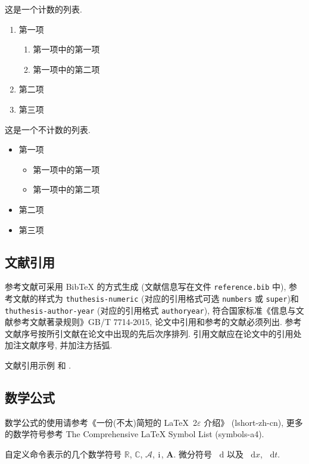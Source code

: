 \documentclass[zihao=-4]{ctexart}
\numberwithin{equation}{section}
\numberwithin{figure}{section}
\numberwithin{table}{section}
\theoremstyle{plain}
\newcommand{\dif}{\mathop{}\!\mathrm{d}}
\newcommand{\CC}{\ensuremath{\mathbb{C}}}
\newcommand{\RR}{\ensuremath{\mathbb{R}}}
\newcommand{\dx}[1][x]{\mathop{}\!\mathrm{d}#1}
\newcommand{\ii}{\mathrm{i}\mkern1mu} %
\newcommand{\A}{\mathcal{A}}
\newcommand{\bA}{\boldsymbol{A}}
\begin{document}
这是一个计数的列表.
\begin{enumerate}%
  \item 第一项
    \begin{enumerate}
      \item 第一项中的第一项
      \item 第一项中的第二项
    \end{enumerate}
  \item 第二项
  \item 第三项
\end{enumerate}


这是一个不计数的列表.
\begin{itemize}%
  \item 第一项
  \begin{itemize}
    \item 第一项中的第一项
    \item 第一项中的第二项
  \end{itemize}
  \item 第二项
  \item 第三项
\end{itemize}



\subsection{文献引用}

参考文献可采用 BibTeX 的方式生成 (文献信息写在文件 \verb|reference.bib| 中), 参考文献的样式为 \verb|thuthesis-numeric| (对应的引用格式可选 \verb|numbers| 或  \verb|super|)和 \verb|thuthesis-author-year| (对应的引用格式 \verb|authoryear|), 符合国家标准《信息与文献参考文献著录规则》GB/T 7714-2015, 论文中引用和参考的文献必须列出. 参考文献序号按所引文献在论文中出现的先后次序排列. 引用文献应在论文中的引用处加注文献序号, 并加注方括弧.

文献引用示例 \cite{LiLiu1997} 和 \cite{Adams2003,Shen1994}.


\subsection{数学公式}

数学公式的使用请参考《一份(不太)简短的 \LaTeX~2$\varepsilon$ 介绍》 (lshort-zh-cn), 更多的数学符号参考 The Comprehensive LaTeX Symbol List (symbols-a4).

自定义命令表示的几个数学符号 $\RR$, $\CC$, $\A$, $\ii$, $\bA$. 微分符号 $\dif$ 以及 $\dx$, $\dx[t]$.
\end{document}

